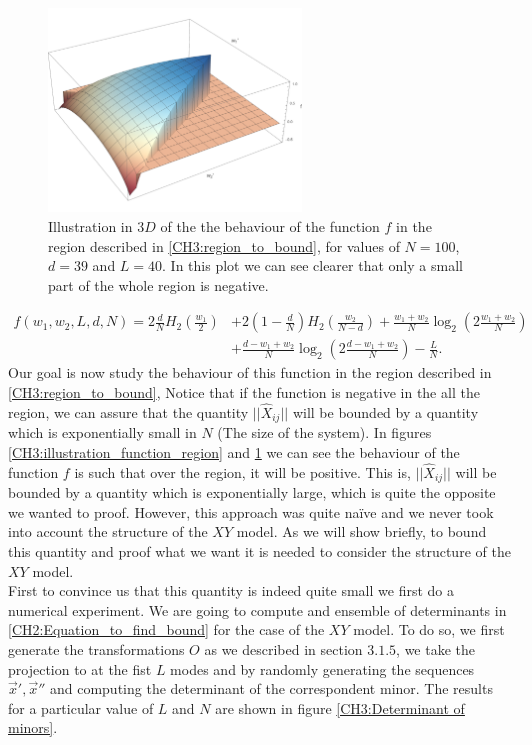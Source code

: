 \begin{figure}
\centering
\includegraphics[width = 0.6\textwidth]{Figures/Results_Weights_3d.pdf}
\caption{Illustration in $3D$ of the the behaviour of the function $f$ in the region described in \eqref{CH3:region_to_bound},  for values of $N=100$, $d=39$ and $L=40$. In this plot we can see clearer that only a small part of the whole region is negative.}
       \label{CH3:illustration_relation_with_weights_3D}
\end{figure}
 \begin{equation}
\begin{split}
    f(w_1,w_2,L,d,N) = 2\frac{d}{N}H_{2}\left(\frac{w_1}{2}\right) &+ 2 \left(1-\frac{d}{N}\right)H_{2}\left(\frac{w_2}{N-d}\right)+\frac{w_1+w_2}{N}\log_2\left(2\frac{w_1+w_2}{N}\right)\\
    & + \frac{d-w_1+w_2}{N}\log_2\left(2\frac{d-w_1+w_2}{N}\right)-\frac{L}{N}.
\end{split}
\end{equation}
Our goal is now study the behaviour of this function in the region described in \eqref{CH3:region_to_bound}, Notice that if the function is negative in the all the region, we can assure that the quantity $||\hat{X}_{ij}||$ will be bounded by a quantity which is exponentially small in $N$ (The size of the system). In figures \ref{CH3:illustration_function_region} and \ref{CH3:illustration_relation_with_weights_3D} we can see the behaviour of the function $f$ is such that over the region, it will be positive. This is, $||\hat{X}_{ij}||$ will be bounded by a quantity which is exponentially large, which is quite the opposite we wanted to proof. However, this approach was quite na\"ive and we never took into account the structure of the $XY$ model. As we will show briefly, to bound this quantity and proof what we want it is needed to consider the structure of the $XY$ model.\\
First to convince us that this quantity is indeed quite small we first do a numerical experiment. We are going to compute and ensemble of determinants in \eqref{CH2:Equation_to_find_bound} for the case of the $XY$ model. To do so, we first generate the transformations $O$ as we described in section $3.1.5$, we take the projection to at the fist $L$ modes and by randomly generating the sequences $\vec{x}',\vec{x}''$ and computing the determinant of the correspondent minor. The results for a particular value of $L$ and $N$ are shown in figure \ref{CH3:Determinant of minors}.

